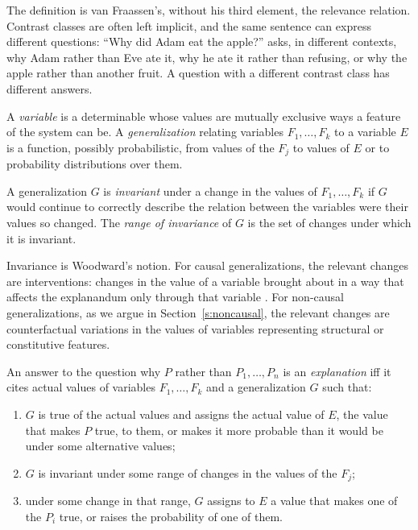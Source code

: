 \documentclass{situationist-preprint}
\begin{document}
The definition is van Fraassen's, without his third element, the relevance relation. Contrast classes are often left implicit, and the same sentence can express different questions: \enquote{Why did Adam eat the apple?} asks, in different contexts, why Adam rather than Eve ate it, why he ate it rather than refusing, or why the apple rather than another fruit. A question with a different contrast class has different answers.

\begin{definition}\label{d:gen}
A \emph{variable} is a determinable whose values are mutually exclusive ways a feature of the system can be. A \emph{generalization} relating variables $F_1, \dots, F_k$ to a variable $E$ is a function, possibly probabilistic, from values of the $F_j$ to values of $E$ or to probability distributions over them.
\end{definition}

\begin{definition}[Invariance]\label{d:inv}
A generalization $G$ is \emph{invariant} under a change in the values of $F_1, \dots, F_k$ if $G$ would continue to correctly describe the relation between the variables were their values so changed. The \emph{range of invariance} of $G$ is the set of changes under which it is invariant.
\end{definition}

Invariance is Woodward's notion. For causal generalizations, the relevant changes are interventions: changes in the value of a variable brought about in a way that affects the explanandum only through that variable \citep{Woodward2003}. For non-causal generalizations, as we argue in Section~\ref{s:noncausal}, the relevant changes are counterfactual variations in the values of variables representing structural or constitutive features.

\begin{principle}[Explanation]\label{p:expl}
An answer to the question why $P$ rather than $P_1, \dots, P_n$ is an \emph{explanation} iff it cites actual values of variables $F_1, \dots, F_k$ and a generalization $G$ such that:
\begin{enumerate}[label=(\alph*)]
\item $G$ is true of the actual values and assigns the actual value of $E$, the value that makes $P$ true, to them, or makes it more probable than it would be under some alternative values;
\item $G$ is invariant under some range of changes in the values of the $F_j$;
\item under some change in that range, $G$ assigns to $E$ a value that makes one of the $P_i$ true, or raises the probability of one of them.
\end{enumerate}
\end{principle}
\end{document}
